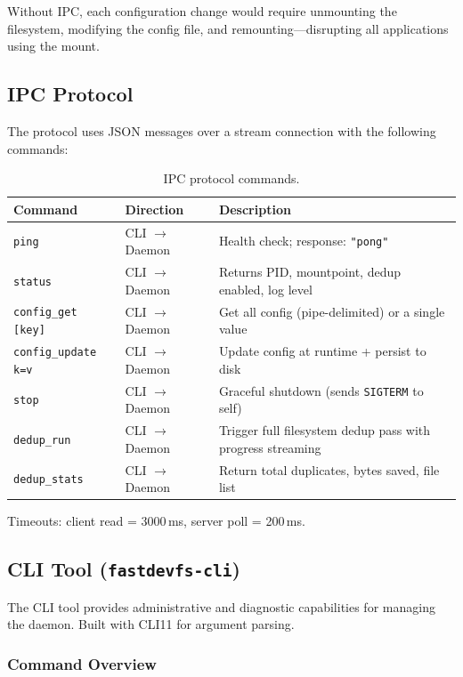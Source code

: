 \documentclass[12pt, a4paper]{article}
\begin{document}
Without IPC, each configuration change would require unmounting the filesystem, modifying the config file, and remounting---disrupting all applications using the mount.

\subsection{IPC Protocol}

The protocol uses JSON messages over a stream connection with the following commands:

\begin{table}[H]
\centering
\small
\begin{tabular}{llp{5cm}}
\toprule
\textbf{Command} & \textbf{Direction} & \textbf{Description} \\
\midrule
\texttt{ping} & CLI $\to$ Daemon & Health check; response: \texttt{"pong"} \\
\texttt{status} & CLI $\to$ Daemon & Returns PID, mountpoint, dedup enabled, log level \\
\texttt{config\_get [key]} & CLI $\to$ Daemon & Get all config (pipe-delimited) or a single value \\
\texttt{config\_update k=v} & CLI $\to$ Daemon & Update config at runtime + persist to disk \\
\texttt{stop} & CLI $\to$ Daemon & Graceful shutdown (sends \texttt{SIGTERM} to self) \\
\texttt{dedup\_run} & CLI $\to$ Daemon & Trigger full filesystem dedup pass with progress streaming \\
\texttt{dedup\_stats} & CLI $\to$ Daemon & Return total duplicates, bytes saved, file list \\
\bottomrule
\end{tabular}
\caption{IPC protocol commands.}
\end{table}

Timeouts: client read = 3000\,ms, server poll = 200\,ms.

\subsection{CLI Tool (\texttt{fastdevfs-cli})}

The CLI tool provides administrative and diagnostic capabilities for managing the daemon. Built with CLI11 for argument parsing.

\subsubsection{Command Overview}
\end{document}
